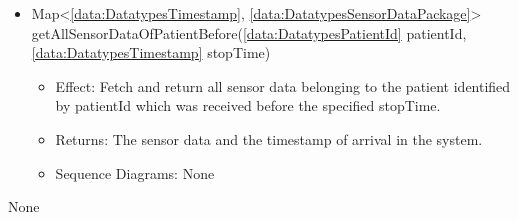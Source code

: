 \begin{description}
\begin{itemize}[noitemsep,nolistsep,leftmargin=-.25cm]
\begin{itemize}[noitemsep,nolistsep]
           \item Returns: The sensor data and the timestamp of arrival in the system.
           \item Sequence Diagrams: None
        \end{itemize}
      \item \textsf{Map\textless{}\ref{data:DatatypesTimestamp}, \ref{data:DatatypesSensorDataPackage}\textgreater{} getAllSensorDataOfPatientBefore(\ref{data:DatatypesPatientId} patientId, \ref{data:DatatypesTimestamp} stopTime)}
        \begin{itemize}[noitemsep,nolistsep]
           \item Effect: Fetch and return all sensor data belonging to the patient identified by patientId which was received before the specified stopTime. 
           \item Returns: The sensor data and the timestamp of arrival in the system.
           \item Sequence Diagrams: None
        \end{itemize}
    \end{itemize}
      \item[Diagrams:] None
    \end{description}

